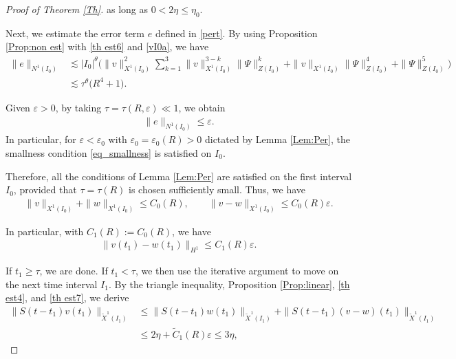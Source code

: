 \documentclass[letterpaper, 11pt,  reqno]{amsart}
\newcommand{\1}{\hspace{0.5mm}\text{I}\hspace{0.5mm}}
\newcommand{\noi}{\noindent}
\newcommand{\eps}{\varepsilon}
\newcommand{\wt}{\widetilde}
\newcommand{\les}{\lesssim}
\numberwithin{equation}{section}
\numberwithin{theorem}{section}
\begin{document}
\begin{proof}[Proof of Theorem \ref{Th}]
\noi
as long as 
$0<2\eta\leq\eta_0$.




Next, we estimate the error term $e$ defined in \eqref{pert}.
By using Proposition \ref{Prop:non est} with
\eqref{th est6} and \eqref{vI0a},
 we have
\begin{align*}
\| e \|_{N^1(I_0)}
&\les
|I_0|^\theta
\Big(
\|v\|_{X^1(I_0)}^2
\sum_{k=1}^3
\|v\|_{X^1(I_0)}^{3-k}\|\Psi\|_{Z(I_0)}^k
+ \| v \|_{X^1(I_0)} \| \Psi \|_{Z(I_0)}^4
+ \| \Psi \|_{Z(I_0)}^5
\Big)
\\
&\les
\tau^\theta
\big(
R^4 + 1
\big).
\end{align*}


\noi
Given $\eps>0$, 
by taking $\tau =\tau (R, \eps) \ll 1$,
we obtain
\begin{align*}
\| e \|_{N^1(I_0)}
\le\eps.
\end{align*}
In particular,
for $\eps < \eps_0$ with $\eps_0 = \eps_0(R) > 0$ 
dictated by Lemma \ref{Lem:Per}, the smallness condition \eqref{eq_smallness} is
satisfied on $I_0$.


Therefore, all the conditions of Lemma  \ref{Lem:Per} are satisfied on the first interval $I_0$, 
provided that $\tau = \tau (R)$ is chosen sufficiently small.
Thus, we have
\begin{align*}
    \|v\|_{X^1(I_0)}+\|w\|_{X^1(I_0)}\leq C_0(R),
    \quad \quad
    \|v-w\|_{X^1(I_0)}\leq C_0(R)\eps.
\end{align*}


\noi
In particular, with $C_1(R) := C_0(R)$,
we have
\begin{align}\label{th est7}
    \|v(t_1)-w(t_1)\|_{H^1}\leq C_1(R)\eps.
\end{align}


If $t_1 \ge \tau$,
we are done. 
If $t_1< \tau$,
we then use the iterative argument to move on the next time interval $I_1$.
By the triangle inequality,
Proposition \ref{Prop:linear}, 
\eqref{th est4}, and \eqref{th est7}, we derive 
\[
\begin{aligned}
    \|S(t-t_1)v(t_1)\|_{\wt X^1(I_1)}
    &\leq
    \|S(t-t_1)w(t_1)\|_{\wt X^1(I_1)}
    +\|S(t-t_1)(v-w)(t_1)\|_{\wt X^1(I_1)}\\
    &\le
    2\eta+\wt C_1(R)\eps
    \le 3\eta,
\end{aligned}
\]




\end{proof}
\end{document}
